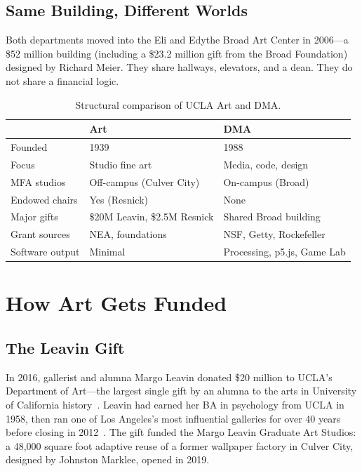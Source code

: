 \documentclass[10pt,letterpaper,twocolumn]{article}
\newcommand{\dma}{\textsc{DMA}}
\begin{document}
\subsection{Same Building, Different Worlds}

Both departments moved into the Eli and Edythe Broad Art Center in 2006---a \$52 million building (including a \$23.2 million gift from the Broad Foundation) designed by Richard Meier. They share hallways, elevators, and a dean. They do not share a financial logic.

\begin{table}[h]
\small
\centering
\begin{tabularx}{\columnwidth}{lXX}
\toprule
& \textbf{Art} & \textbf{DMA} \\
\midrule
Founded & 1939 & 1988 \\
Focus & Studio fine art & Media, code, design \\
MFA studios & Off-campus (Culver City) & On-campus (Broad) \\
Endowed chairs & Yes (Resnick) & None \\
Major gifts & \$20M Leavin, \$2.5M Resnick & Shared Broad building \\
Grant sources & NEA, foundations & NSF, Getty, Rockefeller \\
Software output & Minimal & Processing, p5.js, Game Lab \\
\bottomrule
\end{tabularx}
\caption{Structural comparison of UCLA Art and \dma{}.}
\label{tab:comparison}
\end{table}

\section{How Art Gets Funded}

\subsection{The Leavin Gift}

In 2016, gallerist and alumna Margo Leavin donated \$20 million to UCLA's Department of Art---the largest single gift by an alumna to the arts in University of California history~\citep{leavin2016gift}. Leavin had earned her BA in psychology from UCLA in 1958, then ran one of Los Angeles's most influential galleries for over 40 years before closing in 2012~\citep{leavinmemorial}. The gift funded the Margo Leavin Graduate Art Studios: a 48,000 square foot adaptive reuse of a former wallpaper factory in Culver City, designed by Johnston Marklee, opened in 2019.
\end{document}
